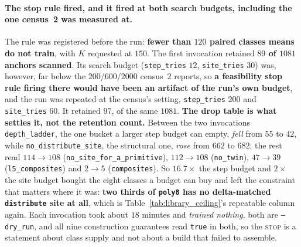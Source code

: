 \paragraph{The stop rule fired, and it fired at both search budgets, including the one census~2 was measured at.} The rule was registered before the run: \textbf{fewer than $120$ paired classes means do not train}, with $K$ requested at $150$. The first invocation retained \textbf{$89$ of $1081$ anchors scanned}. Its search budget (\texttt{step\_tries} $12$, \texttt{site\_tries} $30$) was, however, far below the $200$/$600$/$2000$ census~2 reports, so \textbf{a feasibility stop rule firing there would have been an artifact of the run's own budget}, and the run was repeated at the census's setting, \texttt{step\_tries} $200$ and \texttt{site\_tries} $60$. It retained \textbf{$97$}, of the same $1081$. \textbf{The drop table is what settles it, not the retention count.} Between the two invocations \texttt{depth\_ladder}, the one bucket a larger step budget can empty, \emph{fell} from $55$ to $42$, while \texttt{no\_distribute\_site}, the structural one, \emph{rose} from $662$ to $682$; the rest read $114\to108$ (\texttt{no\_site\_for\_a\_primitive}), $112\to108$ (\texttt{no\_twin}), $47\to39$ (\texttt{l5\_composites}) and $2\to5$ (\texttt{composites}). So $16.7\times$ the step budget and $2\times$ the site budget bought the eight classes a budget can buy and left the constraint that matters where it was: \textbf{two thirds of \texttt{poly8} has no delta-matched \texttt{distribute} site at all}, which is Table~\ref{tab:library_ceiling}'s repeatable column again. Each invocation took about $18$ minutes and \emph{trained nothing}, both are \texttt{--dry\_run}, and all nine construction guarantees read \texttt{true} in both, so the \textsc{stop} is a statement about class supply and not about a build that failed to assemble.

